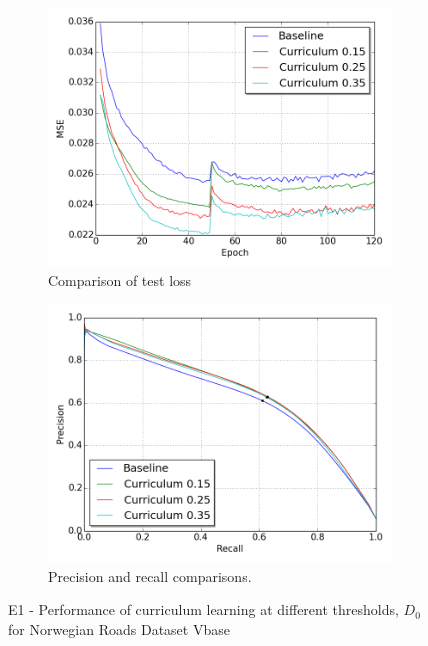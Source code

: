 \begin{figure}[!h]
\begin{subfigure}{0.5\textwidth}
\includegraphics[width=\linewidth]{figs/E5/E5-lc.png}
\caption{Comparison of test loss} \label{fig:E5_curr_norway_loss}
\end{subfigure}
\hspace*{\fill} %
\begin{subfigure}{0.5\textwidth}
\includegraphics[width=\linewidth]{figs/E5/E5-pr.png}
\caption{Precision and recall comparisons.} \label{fig:E5_curr_norway_pr}
\end{subfigure}
\hspace*{\fill} %
\caption[E1 - Performance of curriculum learning for Norwegian Roads Dataset Vbase]{E1 - Performance of curriculum learning at different thresholds, $D_{0}$ for Norwegian Roads Dataset Vbase} \label{fig:E5_curriculum_norway}
\end{figure}

